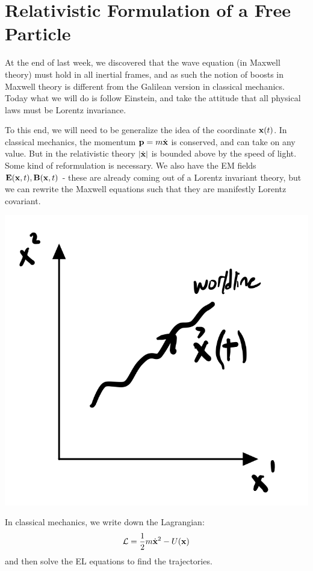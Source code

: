 \section{Relativistic Formulation of a Free Particle}

At the end of last week, we discovered that the wave equation (in Maxwell theory) must hold in all inertial frames, and as such the notion of boosts in Maxwell theory is different from the Galilean version in classical mechanics. Today what we will do is follow Einstein, and take the attitude that all physical laws must be Lorentz invariance.

To this end, we will need to be generalize the idea of the coordinate $\mathbf{x}(t)$. In classical mechanics, the momentum $\mathbf{p} = m\dot{\mathbf{x}}$ is conserved, and can take on any value. But in the relativistic theory $\lvert \dot{\mathbf{x}} \rvert$ is bounded above by the speed of light. Some kind of reformulation is necessary. We also have the EM fields $\mathbf{E}(\mathbf{x}, t), \mathbf{B}(\mathbf{x}, t)$ - these are already coming out of a Lorentz invariant theory, but we can rewrite the Maxwell equations such that they are manifestly Lorentz covariant.

\begin{center}
    \includegraphics[scale=0.35]{Lectures/Images/lec3-worldline.png}
\end{center}

In classical mechanics, we write down the Lagrangian:
\begin{equation}
    \mathcal{L} = \frac{1}{2}m\dot{\mathbf{x}}^2 - U(\mathbf{x})
\end{equation}
and then solve the EL equations to find the trajectories. 

